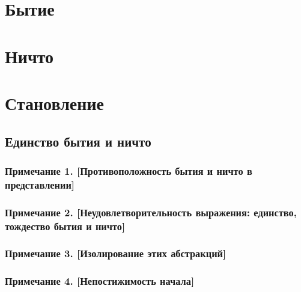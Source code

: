 \documentclass[12pt]{memoir}
\begin{document}
\section{Бытие}



\section{Ничто}



\section{Становление}

\subsection{Единство бытия и ничто}



\subsubsection{Примечание 1. [Противоположность бытия и ничто в представлении]}



\subsubsection{Примечание 2. [Неудовлетворительность выражения: единство, тождество бытия и ничто]}



\subsubsection{Примечание 3. [Изолирование этих абстракций]}



\subsubsection{Примечание 4. [Непостижимость начала]}


\end{document}
